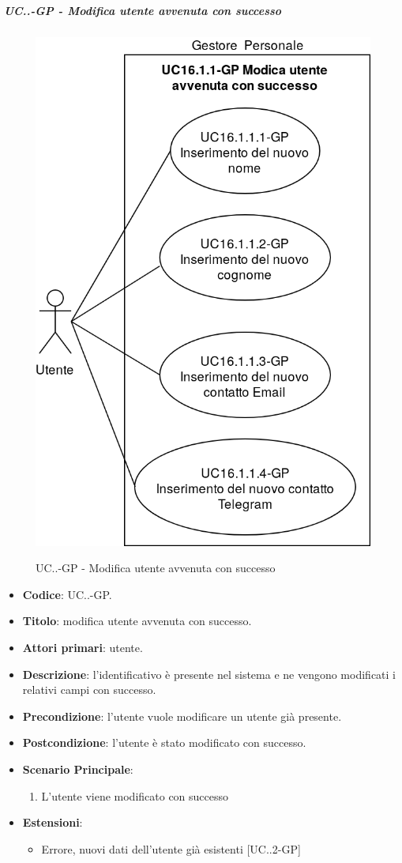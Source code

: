 		\subparagraph{UC\theuccount.\thesubuccount.\thesubsubuccount-GP - Modifica utente avvenuta con successo}
			\begin{figure}[H]
				\centering
				\includegraphics[width=0.5\columnwidth]{img/casi_d'uso/UC16_1_1.png}\\
				\caption{UC\theuccount.\thesubuccount.\thesubsubuccount-GP - Modifica utente avvenuta con successo}
			\end{figure}
			\begin{itemize}
				\item \textbf{Codice}: UC\theuccount.\thesubuccount.\thesubsubuccount-GP.
				\item \textbf{Titolo}: modifica utente avvenuta con successo.
				\item \textbf{Attori primari}: utente.
				\item \textbf{Descrizione}: l'identificativo è presente nel sistema e ne vengono modificati i relativi campi con successo.
				\item \textbf{Precondizione}: l'utente vuole modificare un utente già presente.
				\item \textbf{Postcondizione}: l'utente è stato modificato con successo.
				\item \textbf{Scenario Principale}:
				\begin{enumerate}
					\item L'utente viene modificato con successo
				\end{enumerate}
				\item \textbf{Estensioni}:
				\begin{itemize}
					\item Errore, nuovi dati dell'utente già esistenti [UC\theuccount.\thesubuccount.2-GP]
				\end{itemize}
			\end{itemize}
			
